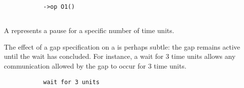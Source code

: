 \begin{figure}[H]
\begin{subfigure}[t]{\egtextwidth}
\begin{lstlisting}[style=Example]
->op O1()
\end{lstlisting}
\end{subfigure}
\hfill
\begin{subfigure}[t]{\eggraphicalwidth}
\gsecaption
\centering
{}
\end{subfigure}

\end{figure}

\subsection{\mwaitaction}\label{ssec:metamodel-actions-waits}

A \mwaitaction{} represents a pause for a specific number of time
units.

\begin{remark}
  The effect of a gap specification on a \mwaitaction{} is perhaps
  subtle: the gap remains active until the wait has concluded.  For
  instance, a wait for \(3\) time units allows any communication
  allowed by the gap to occur for \(3\) time units.
\end{remark} 

\begin{figure}[H]
\begin{subfigure}[t]{\egtextwidth}
\begin{lstlisting}[style=Example]
wait for 3 units
\end{lstlisting}
\end{subfigure}
\hfill
\begin{subfigure}[t]{\eggraphicalwidth}
\gsecaption
\centering
{}
\end{subfigure}

\end{figure}

